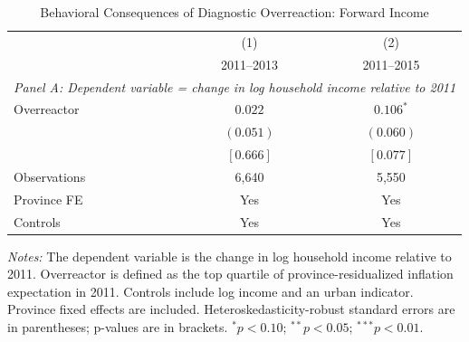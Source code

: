 \begin{table}[htbp]
\centering
\begin{threeparttable}
\caption{Behavioral Consequences of Diagnostic Overreaction: Forward Income}
\label{tab:chfs_consumption_consequences}
{\small
\begin{tabular}{lcc}
\toprule
 & (1) & (2) \\
 & 2011--2013 & 2011--2015 \\
\midrule
\multicolumn{3}{l}{\textit{Panel A: Dependent variable = change in log household income relative to 2011}} \\
\addlinespace
Overreactor & $0.022$ & $0.106^{*}$ \\
 & $(0.051)$ & $(0.060)$ \\
 & $[0.666]$ & $[0.077]$ \\
\addlinespace
Observations & 6,640 & 5,550 \\
Province FE & Yes & Yes \\
Controls & Yes & Yes \\
\bottomrule
\end{tabular}
}
\begin{tablenotes}[flushleft]
\footnotesize
\item \textit{Notes:} The dependent variable is the change in log household income relative to 2011. Overreactor is defined as the top quartile of province-residualized inflation expectation in 2011. Controls include log income and an urban indicator. Province fixed effects are included. Heteroskedasticity-robust standard errors are in parentheses; p-values are in brackets. $^{*}p<0.10$; $^{**}p<0.05$; $^{***}p<0.01$.
\end{tablenotes}
\end{threeparttable}
\end{table}
